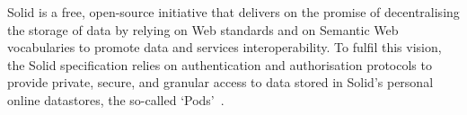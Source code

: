 Solid is a free, open-source initiative that delivers on the promise of decentralising the storage of data by relying on Web standards and on Semantic Web vocabularies to promote data and services interoperability. To fulfil this vision, the Solid specification relies on authentication and authorisation protocols to provide private, secure, and granular access to data stored in Solid's personal online datastores, the so-called `Pods'~\citep{mansour_demonstration_2016}.